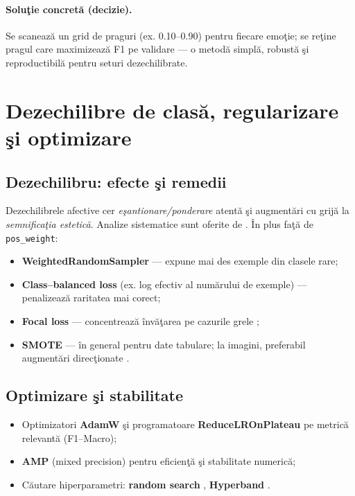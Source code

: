 \paragraph{Soluţie concretă (decizie).} Se scanează un grid de praguri (ex. 0.10–0.90) pentru fiecare emoţie; se reţine pragul care maximizează F1 pe validare — o metodă simplă, robustă şi reproductibilă pentru seturi dezechilibrate.

\section{Dezechilibre de clasă, regularizare şi optimizare}

\subsection{Dezechilibru: efecte şi remedii}

Dezechilibrele afective cer \emph{eşantionare/ponderare} atentă şi augmentări cu grijă la \emph{semnificaţia estetică}. Analize sistematice sunt oferite de \cite{buda2018systematic}. În plus faţă de \texttt{pos\_weight}:
\begin{itemize}[leftmargin=*, itemsep=2pt, topsep=2pt]
  \item \textbf{WeightedRandomSampler} — expune mai des exemple din clasele rare;
  \item \textbf{Class–balanced loss} (ex. log efectiv al numărului de exemple) — penalizează raritatea mai corect;
  \item \textbf{Focal loss} — concentrează învăţarea pe cazurile grele \cite{lin2017focal};
  \item \textbf{SMOTE} — în general pentru date tabulare; la imagini, preferabil augmentări direcţionate \cite{chawla2002smote}.
\end{itemize}

\subsection{Optimizare şi stabilitate}

\begin{itemize}[leftmargin=*, itemsep=2pt, topsep=2pt]
  \item Optimizatori \textbf{AdamW} şi programatoare \textbf{ReduceLROnPlateau} pe metrică relevantă (F1–Macro);
  \item \textbf{AMP} (mixed precision) pentru eficienţă şi stabilitate numerică;
  \item Căutare hiperparametri: \textbf{random search} \cite{bergstra2012random}, \textbf{Hyperband} \cite{li2017hyperband}.
\end{itemize}

